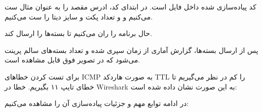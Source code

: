 	\pagebreak

	
	
	
کد پیاده‌سازی شده داخل فایل
است. در ابتدای کد، ادرس مقصد را به عنوان مثال 
ست می‌کنیم و 
و تعداد پکت و سایز دیتا را ست ‌می‌کنیم. 

حال برنامه را ران‌ می‌کنیم تا بسته‌ها را ارسال کند. 


{
}

پس از ارسال بسته‌ها، گزارش آماری از زمان سپری شده و تعداد بسته‌های سالم پرینت می‌شود که در تصویر فوق قابل مشاهده است.



برای تست کردن خطاهای ICMP به صورت هاردکد TTL را کم در نظر می‌گیریم تا خطای تایپ ۱۱ بگیریم.
خطا در Wireshark به این صورت نشان داده شده است:


{
}

\pagebreak


در ادامه توابع مهم و جزئیات پیاده‌سازی آن را مشاهده می‌کنیم:


